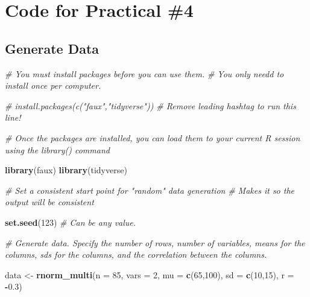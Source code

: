 \documentclass[
]{book}
\newenvironment{Shaded}{\begin{snugshade}}{\end{snugshade}}
\newcommand{\AttributeTok}[1]{\textcolor[rgb]{0.13,0.29,0.53}{#1}}
\newcommand{\CommentTok}[1]{\textcolor[rgb]{0.56,0.35,0.01}{\textit{#1}}}
\newcommand{\ConstantTok}[1]{\textcolor[rgb]{0.56,0.35,0.01}{#1}}
\newcommand{\DecValTok}[1]{\textcolor[rgb]{0.00,0.00,0.81}{#1}}
\newcommand{\FloatTok}[1]{\textcolor[rgb]{0.00,0.00,0.81}{#1}}
\newcommand{\FunctionTok}[1]{\textcolor[rgb]{0.13,0.29,0.53}{\textbf{#1}}}
\newcommand{\NormalTok}[1]{#1}
\newcommand{\OtherTok}[1]{\textcolor[rgb]{0.56,0.35,0.01}{#1}}
\newcommand{\SpecialCharTok}[1]{\textcolor[rgb]{0.81,0.36,0.00}{\textbf{#1}}}
\begin{document}
\section*{Code for Practical \#4}\label{code-for-practical-4}

\begin{Shaded}
\end{Shaded}

\subsection*{Generate Data}\label{generate-data}

\begin{Shaded}
\begin{Highlighting}[]
\CommentTok{\# You must install packages before you can use them.}
\CommentTok{\# You only needd to install once per computer. }

\CommentTok{\# install.packages(c("faux","tidyverse")) \# Remove leading hashtag to run this line! }


\CommentTok{\# Once the packages are installed, you can load them to your current R session using the library() command }

\FunctionTok{library}\NormalTok{(faux)}
\FunctionTok{library}\NormalTok{(tidyverse)}

\CommentTok{\# Set a consistent start point for "random" data generation}
\CommentTok{\# Makes it so the output will be consistent}

\FunctionTok{set.seed}\NormalTok{(}\DecValTok{123}\NormalTok{) }\CommentTok{\# Can be any value. }


\CommentTok{\# Generate data. Specify the number of rows, number of variables, means for the columns, sd\textquotesingle{}s for the columns, and the correlation between the columns.}

\NormalTok{data }\OtherTok{\textless{}{-}} \FunctionTok{rnorm\_multi}\NormalTok{(}\AttributeTok{n =} \DecValTok{85}\NormalTok{, }\AttributeTok{vars =} \DecValTok{2}\NormalTok{, }\AttributeTok{mu =} \FunctionTok{c}\NormalTok{(}\DecValTok{65}\NormalTok{,}\DecValTok{100}\NormalTok{), }\AttributeTok{sd =} \FunctionTok{c}\NormalTok{(}\DecValTok{10}\NormalTok{,}\DecValTok{15}\NormalTok{), }\AttributeTok{r =} \SpecialCharTok{{-}}\FloatTok{0.3}\NormalTok{)}
\end{Highlighting}
\end{Shaded}
\end{document}
